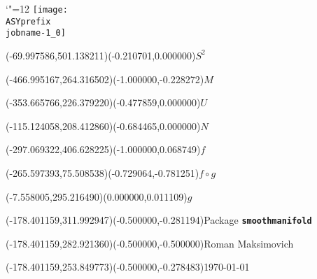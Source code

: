 \setlength{\unitlength}{1pt}%
\makeatletter%
\let\ASYencoding\f@encoding%
\let\ASYfamily\f@family%
\let\ASYseries\f@series%
\let\ASYshape\f@shape%
\makeatother%
{\catcode`"=12%
\texttt{[image: \\ASYprefix\\jobname-1\_0]}%
}%
%
\fontsize{12.000000}{14.400000}\selectfont%
\usefont{\ASYencoding}{\ASYfamily}{\ASYseries}{\ASYshape}%
\ASYalign(-69.997586,501.138211)(-0.210701,0.000000){$S^2$}%
%
\fontsize{12.000000}{14.400000}\selectfont%
\ASYalign(-466.995167,264.316502)(-1.000000,-0.228272){$M$}%
%
\fontsize{12.000000}{14.400000}\selectfont%
\ASYalign(-353.665766,226.379220)(-0.477859,0.000000){$U$}%
%
\fontsize{12.000000}{14.400000}\selectfont%
\ASYalign(-115.124058,208.412860)(-0.684465,0.000000){$N$}%
%
\fontsize{12.000000}{14.400000}\selectfont%
\ASYalign(-297.069322,406.628225)(-1.000000,0.068749){$f$}%
%
\fontsize{12.000000}{14.400000}\selectfont%
\ASYalign(-265.597393,75.508538)(-0.729064,-0.781251){$f \circ g$}%
%
\fontsize{12.000000}{14.400000}\selectfont%
\ASYalign(-7.558005,295.216490)(0.000000,0.011109){$g$}%
%
\fontsize{12.000000}{14.400000}\selectfont%
\ASYalign(-178.401159,311.992947)(-0.500000,-0.281194){\Large Package \textbf{\texttt{smoothmanifold}}}%
%
\fontsize{12.000000}{14.400000}\selectfont%
\ASYalign(-178.401159,282.921360)(-0.500000,-0.500000){Roman Maksimovich}%
%
\fontsize{12.000000}{14.400000}\selectfont%
\ASYalign(-178.401159,253.849773)(-0.500000,-0.278483){\today}%
